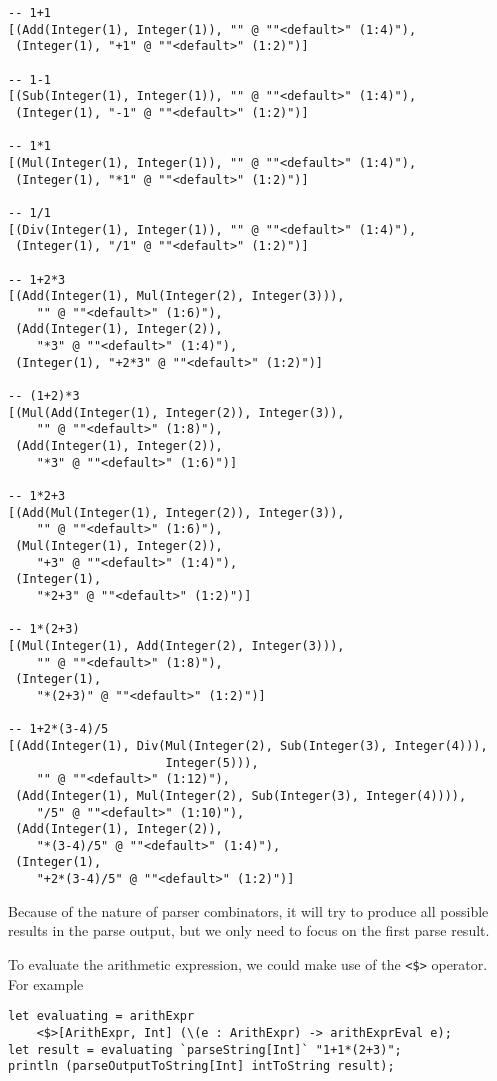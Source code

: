 \begin{lstlisting}[language={}]
-- 1+1
[(Add(Integer(1), Integer(1)), "" @ ""<default>" (1:4)"),
 (Integer(1), "+1" @ ""<default>" (1:2)")]

-- 1-1
[(Sub(Integer(1), Integer(1)), "" @ ""<default>" (1:4)"),
 (Integer(1), "-1" @ ""<default>" (1:2)")]

-- 1*1
[(Mul(Integer(1), Integer(1)), "" @ ""<default>" (1:4)"),
 (Integer(1), "*1" @ ""<default>" (1:2)")]

-- 1/1
[(Div(Integer(1), Integer(1)), "" @ ""<default>" (1:4)"),
 (Integer(1), "/1" @ ""<default>" (1:2)")]

-- 1+2*3
[(Add(Integer(1), Mul(Integer(2), Integer(3))),
    "" @ ""<default>" (1:6)"),
 (Add(Integer(1), Integer(2)),
    "*3" @ ""<default>" (1:4)"),
 (Integer(1), "+2*3" @ ""<default>" (1:2)")]

-- (1+2)*3
[(Mul(Add(Integer(1), Integer(2)), Integer(3)),
    "" @ ""<default>" (1:8)"),
 (Add(Integer(1), Integer(2)),
    "*3" @ ""<default>" (1:6)")]

-- 1*2+3
[(Add(Mul(Integer(1), Integer(2)), Integer(3)),
    "" @ ""<default>" (1:6)"),
 (Mul(Integer(1), Integer(2)),
    "+3" @ ""<default>" (1:4)"),
 (Integer(1),
    "*2+3" @ ""<default>" (1:2)")]

-- 1*(2+3)
[(Mul(Integer(1), Add(Integer(2), Integer(3))),
    "" @ ""<default>" (1:8)"),
 (Integer(1),
    "*(2+3)" @ ""<default>" (1:2)")]

-- 1+2*(3-4)/5
[(Add(Integer(1), Div(Mul(Integer(2), Sub(Integer(3), Integer(4))),
                      Integer(5))),
    "" @ ""<default>" (1:12)"),
 (Add(Integer(1), Mul(Integer(2), Sub(Integer(3), Integer(4)))),
    "/5" @ ""<default>" (1:10)"),
 (Add(Integer(1), Integer(2)),
    "*(3-4)/5" @ ""<default>" (1:4)"),
 (Integer(1),
    "+2*(3-4)/5" @ ""<default>" (1:2)")]
\end{lstlisting}

Because of the nature of parser combinators, it will try to produce all possible results in the parse output, but we only need to focus on the first parse result.

To evaluate the arithmetic expression, we could make use of the \texttt{<\$>} operator. For example

\begin{lstlisting}
let evaluating = arithExpr
    <$>[ArithExpr, Int] (\(e : ArithExpr) -> arithExprEval e);
let result = evaluating `parseString[Int]` "1+1*(2+3)";
println (parseOutputToString[Int] intToString result);
\end{lstlisting}

